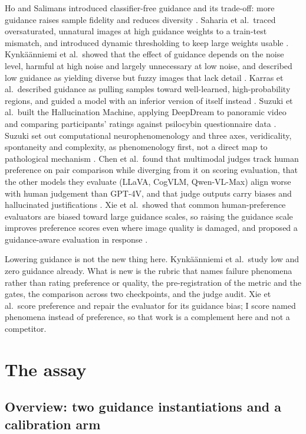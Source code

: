 \documentclass[11pt]{article}
\begin{document}
Ho and Salimans introduced classifier-free guidance and its trade-off: more
guidance raises sample fidelity and reduces diversity \citep{ho2022cfg}. Saharia
et al.~traced oversaturated, unnatural images at high guidance weights to a
train-test mismatch, and introduced dynamic thresholding to keep large weights
usable \citep{saharia2022imagen}. Kynkäänniemi et al.~showed that the effect of
guidance depends on the noise level, harmful at high noise and largely
unnecessary at low noise, and described low guidance as yielding diverse but
fuzzy images that lack detail \citep{kynkaanniemi2024interval}. Karras et
al.~described guidance as pulling samples toward well-learned, high-probability
regions, and guided a model with an inferior version of itself instead
\citep{karras2024autoguidance}. Suzuki et al.~built the Hallucination Machine,
applying DeepDream to panoramic video and comparing participants' ratings
against psilocybin questionnaire data \citep{suzuki2017}. Suzuki set out
computational neurophenomenology and three axes, veridicality, spontaneity and
complexity, as phenomenology first, not a direct map to pathological mechanism
\citep{suzuki2024}. Chen et al.~found that multimodal judges track human
preference on pair comparison while diverging from it on scoring evaluation,
that the other models they evaluate (LLaVA, CogVLM, Qwen-VL-Max) align worse
with human judgement than GPT-4V, and that judge outputs carry biases and
hallucinated justifications \citep{chen2024mllmjudge}. Xie et al.~showed that
common human-preference evaluators are biased toward large guidance scales, so
raising the guidance scale improves preference scores even where image quality
is damaged, and proposed a guidance-aware evaluation in response
\citep{xie2026guidancematters}.

Lowering guidance is not the new thing here. Kynkäänniemi et al.~study low and
zero guidance already. What is new is the rubric that names failure phenomena
rather than rating preference or quality, the pre-registration of the metric and
the gates, the comparison across two checkpoints, and the judge audit. Xie et
al.~score preference and repair the evaluator for its guidance bias; I score
named phenomena instead of preference, so that work is a complement here and not
a competitor.

\section{The assay}\label{the-assay}

\subsection{Overview: two guidance instantiations and a calibration
arm}\label{overview-two-guidance-instantiations-and-a-calibration-arm}
\end{document}
